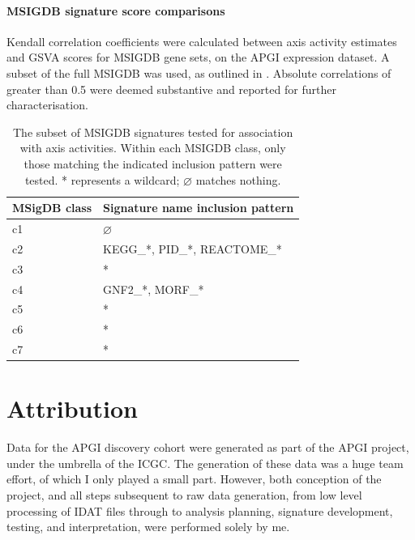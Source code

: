 \documentclass[dissertation.tex]{subfiles}
\begin{document}
\paragraph{\texorpdfstring{\acrshort{MSIGDB}}{MSigDB} signature score comparisons}
Kendall correlation coefficients were calculated between axis activity estimates and \gls{GSVA} scores for \gls{MSIGDB} gene sets, on the \gls{APGI} expression dataset.  A subset of the full \gls{MSIGDB} was used, as outlined in .  Absolute correlations of greater than 0.5 were deemed substantive and reported for further characterisation.

\begin{table}[!htbp]
\centering
\caption[Subset of \texorpdfstring{\acrshort{MSIGDB}}{MSigDB} signatures tested for association with axis activities]{The subset of \acrshort{MSIGDB} signatures tested for association with axis activities.  Within each \gls{MSIGDB} class, only those matching the indicated inclusion pattern were tested.  * represents a wildcard; $\varnothing$ matches nothing.}\label{sigs-msigdb-subset}
\begin{tabular}{@{}ll@{}}
\toprule
MSigDB class & Signature name inclusion pattern   \\ \midrule
c1           & $\varnothing$                      \\
c2           & KEGG\_*, PID\_*, REACTOME\_*       \\
c3           & *                                  \\
c4           & GNF2\_*, MORF\_*                   \\
c5           & *                                  \\
c6           & *                                  \\
c7           & *                                  \\ \bottomrule
\end{tabular}
\end{table}

\section{Attribution}
Data for the \gls{APGI} discovery cohort were generated as part of the \gls{APGI} project, under the umbrella of the \gls{ICGC}.  The generation of these data was a huge team effort, of which I only played a small part.  However, both conception of the project, and all steps subsequent to raw data generation, from low level processing of \gls{IDAT} files through to analysis planning, signature development, testing, and interpretation, were performed solely by me.
\end{document}

